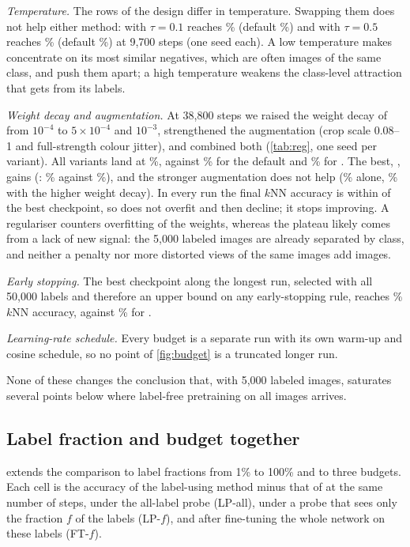 \emph{Temperature.} The rows of the design differ in temperature. Swapping them does not help either
method: \simclr with $\tau=0.1$ reaches \% (default
\%) and \supcon with $\tau=0.5$ reaches \% (default
\%) at 9,700 steps (one seed each). A low temperature makes \simclr
concentrate on its most similar negatives, which are often images of the same class, and push them apart;
a high temperature weakens the class-level attraction that \supcon gets from its labels.

\emph{Weight decay and augmentation.} At 38,800 steps we raised the weight decay of \supcon from
$10^{-4}$ to $5\times10^{-4}$ and $10^{-3}$, strengthened the augmentation (crop scale 0.08--1 and
full-strength colour jitter), and combined both (\cref{tab:reg}, one seed per variant). All variants land at
\%, against \% for the default and \% for
\simclr. The best, , gains \pt (\lpfive: \% against
\%), and the stronger augmentation does not help
(\% alone, \% with the
higher weight decay). In every run the final $k$NN accuracy is within \pt of the best
checkpoint, so \supcon does not overfit and then decline; it stops improving. A regulariser counters
overfitting of the weights, whereas the plateau likely comes from a lack of new signal: the 5,000 labeled
images are already separated by class, and neither a penalty nor more distorted views of the same images
add images.

\emph{Early stopping.} The best checkpoint along the longest \supcon run, selected with all 50,000 labels and
therefore an upper bound on any early-stopping rule, reaches \% $k$NN accuracy, against
\% for \simclr.

\emph{Learning-rate schedule.} Every budget is a separate run with its own warm-up and cosine schedule, so
no point of \cref{fig:budget} is a truncated longer run.

None of these changes the conclusion that, with 5,000 labeled images, \supcon saturates several points below
where label-free pretraining on all images arrives.

\subsection{Label fraction and budget together}
\label{sec:fractions}
 extends the comparison to label fractions from 1\% to 100\% and to three budgets. Each cell
is the accuracy of the label-using method minus that of \simclr at the same number of steps, under the
all-label probe (LP-all), under a probe that sees only the fraction $f$ of the labels (LP-$f$), and after
fine-tuning the whole network on these labels (FT-$f$).

